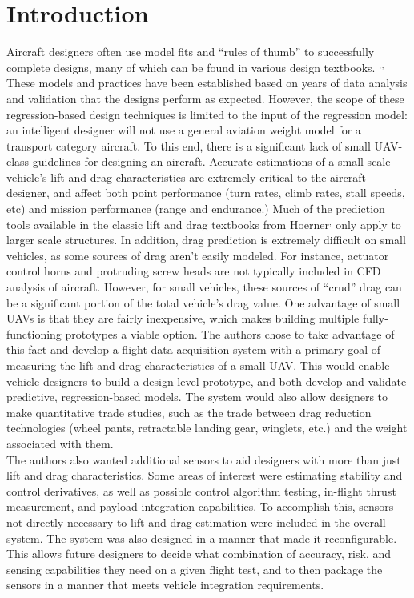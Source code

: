 \section{Introduction}
\label{intro}
Aircraft designers often use model fits and ``rules of thumb'' to successfully complete designs, many of which can be found in various design textbooks. \cite{raymer}$^,$\cite{nicolai2010fundamentals}$^,$\cite{roskam1985airplane} These models and practices have been established based on years of data analysis and validation that the designs perform as expected. However, the scope of these regression-based design techniques is limited to the input of the regression model: an intelligent designer will not use a general aviation weight model for a transport category aircraft. To this end, there is a significant lack of small UAV-class guidelines for designing an aircraft. Accurate estimations of a small-scale vehicle's lift and drag characteristics are extremely critical to the aircraft designer, and affect both point performance (turn rates, climb rates, stall speeds, etc) and mission performance (range and endurance.) Much of the prediction tools available in the classic lift and drag textbooks from Hoerner\cite{hoernerDrag}$^,$\cite{hoernerLift} only apply to larger scale structures. In addition, drag prediction is extremely difficult on small vehicles, as some sources of drag aren't easily modeled. For instance, actuator control horns and protruding screw heads are not typically included in CFD  analysis of aircraft. However, for small vehicles, these sources of ``crud'' drag can be a significant portion of the total vehicle's drag value. One advantage of small UAVs is that they are fairly inexpensive, which makes building multiple fully-functioning prototypes a viable option. The authors chose to take advantage of this fact and develop a flight data acquisition system with a primary goal of measuring the lift and drag characteristics of a small UAV. This would enable vehicle designers to build a design-level prototype, and both develop and validate predictive, regression-based models. The system would also allow designers to make quantitative trade studies, such as the trade between drag reduction technologies (wheel pants, retractable landing gear, winglets, etc.) and the weight associated with them.\\

The authors also wanted additional sensors to aid designers with more than just lift and drag characteristics. Some areas of interest were estimating stability and control derivatives, as well as possible control algorithm testing, in-flight thrust measurement, and payload integration capabilities. To accomplish this, sensors not directly necessary to lift and drag estimation were included in the overall system. The system was also designed in a manner that made it reconfigurable. This allows future designers to decide what combination of accuracy, risk, and sensing capabilities they need on a given flight test, and to then package the sensors in a manner that meets vehicle integration requirements.\\

